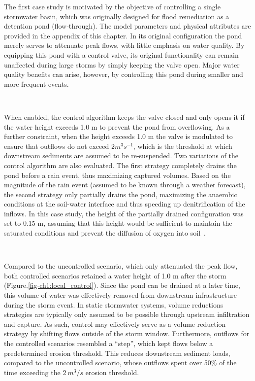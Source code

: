 The first case study is motivated by the objective of controlling a single stormwater basin, which was originally designed for flood remediation as a detention pond (flow-through).  The model parameters and physical attributes are provided in the appendix of this chapter. In its original configuration the pond merely serves to attenuate peak flows, with little emphasis on water quality. By equipping this pond with a control valve, its original functionality can remain unaffected during large storms by simply keeping the valve open.  Major water quality benefits can arise, however, by controlling this pond during smaller and more frequent events. 

\

When enabled, the control algorithm keeps the valve closed and only opens it if the water height exceeds 1.0 m to prevent the pond from overflowing. As a further constraint, when the height exceeds 1.0 m the valve is modulated to ensure that outflows do not exceed $2m^3s^{-1}$, which is the threshold at which downstream sediments are assumed to be re-suspended. Two variations of the control algorithm are also evaluated. The first strategy completely drains the pond before a rain event, thus maximizing captured volumes. Based on the magnitude of the rain event (assumed to be known through a weather forecast), the second strategy only partially drains the pond, maximizing the anaerobic conditions at the soil-water interface and thus speeding up denitrification of the inflows. In this case study, the  height of the partially drained configuration was set to 0.15 m, assuming that this height would be sufficient to maintain the saturated conditions and prevent the diffusion of oxygen into soil~\cite{Reddy1989Nitrification-DenitrificationWetlands}. 

\

Compared to the uncontrolled scenario, which only attenuated the peak flow, both
controlled scenarios retained a water height of 1.0 m after the storm
(Figure.\ref{fig-ch1:local_control}). Since the pond can be drained at a later time,
this volume of water was effectively removed from downstream infrastructure
during the storm event.  In static stormwater systems, volume reductions
strategies are typically only assumed to be possible through upstream
infiltration and capture. As such, control may effectively serve as a volume
reduction strategy by shifting flows outside of the storm window. Furthermore,
outflows for the controlled scenarios resembled a ``step'', which kept flows below a predetermined erosion threshold. This reduces downstream sediment loads, compared to the uncontrolled scenario, whose outflows spent over 50\% of the time exceeding the $2~m^3/s$ erosion threshold. 

